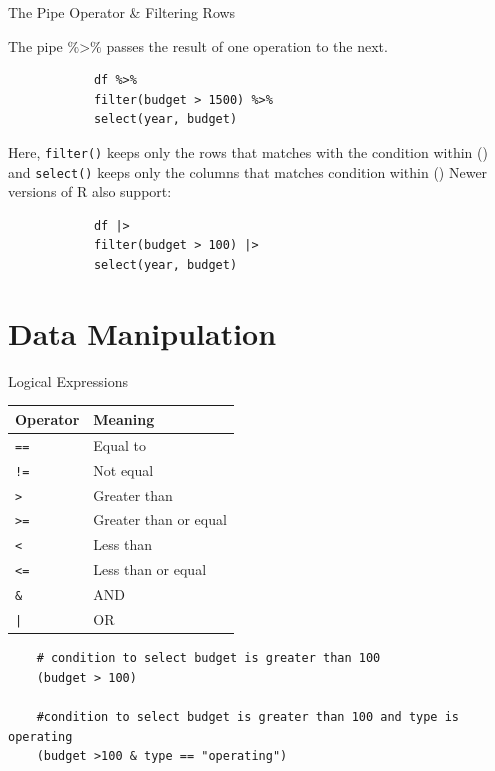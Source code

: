 \documentclass[aspectratio=169,11pt]{beamer}
\begin{document}
	
	\begin{frame}[fragile]{The Pipe Operator \& Filtering Rows}
		
		The pipe
		\(
		\boxed{\texttt{\%>\%}}
		\)
		passes the result of one operation to the next.
		
		\begin{lstlisting}
			df %>%
			filter(budget > 1500) %>%
			select(year, budget)
		\end{lstlisting}
		
		Here, \texttt{filter()} keeps only the rows that matches with the condition within () and \texttt{select()} keeps only the columns that matches condition within () 
		\vspace{.5cm}
		\newline
		Newer versions of R also support:
		
		\begin{lstlisting}
			df |>
			filter(budget > 100) |>
			select(year, budget)
		\end{lstlisting}
		
	\end{frame}
	
	
	\section{Data Manipulation}
	
	\begin{frame}[fragile]{Logical Expressions}
		
		\begin{center}
			\begin{tabular}{ll}
				\toprule
				Operator & Meaning \\
				\midrule
				\texttt{==} & Equal to \\
				\texttt{!=} & Not equal \\
				\texttt{>} & Greater than \\
				\texttt{>=} & Greater than or equal \\
				\texttt{<} & Less than \\
				\texttt{<=} & Less than or equal \\
				\texttt{\&} & AND \\
				\texttt{|} & OR \\
				\bottomrule
			\end{tabular}
		\end{center}
		
		\begin{lstlisting}
	# condition to select budget is greater than 100
	(budget > 100)
	
	#condition to select budget is greater than 100 and type is operating
	(budget >100 & type == "operating")
		
		\end{lstlisting}
		
		
		
	\end{frame}
	
\end{document}
